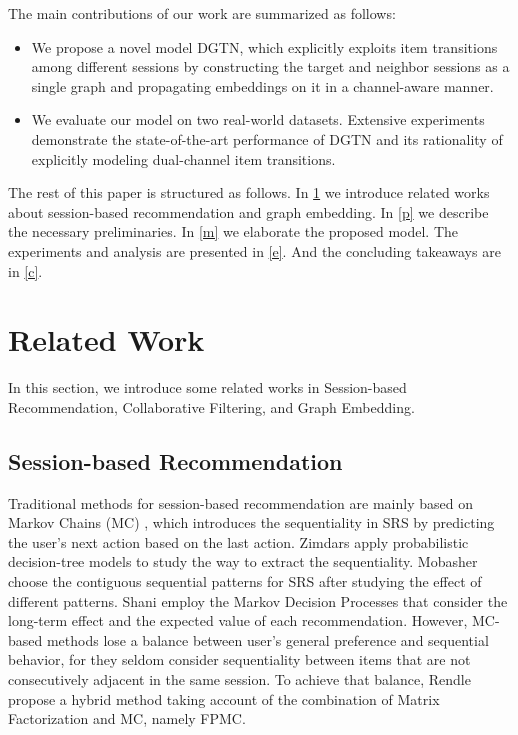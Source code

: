 \documentclass[conference]{IEEEtran}
\begin{document}
The main contributions of our work are summarized as follows:
\begin{itemize}
    \item {We propose a novel model DGTN, which explicitly exploits item transitions among different sessions by constructing the target and neighbor sessions as a single graph and propagating embeddings on it in a channel-aware manner. }  
    \item {We evaluate our model on two real-world datasets. Extensive experiments demonstrate the state-of-the-art performance of DGTN and its rationality of explicitly modeling dual-channel item transitions.}
\end{itemize}

The rest of this paper is structured as follows. In  \ref{r} we introduce related works about session-based recommendation and graph embedding. In  \ref{p} we describe the necessary preliminaries. In  \ref{m} we elaborate the proposed model. The experiments and analysis are presented in  \ref{e}. And the concluding takeaways are in  \ref{c}.


\section{Related Work}
\label{r}
\noindent In this section, we introduce some related works in Session-based Recommendation, Collaborative Filtering, and Graph Embedding.

\subsection{Session-based Recommendation}


\noindent Traditional methods for session-based recommendation are mainly based on Markov Chains (MC) \cite{zimdars01,Mobasher02,shani2005mdp,rendle2010factorizing}, which introduces the sequentiality in SRS by predicting the user's next action based on the last action. Zimdars  \cite{zimdars01} apply probabilistic decision-tree models to study the way to extract the sequentiality. Mobasher  \cite{Mobasher02} choose the contiguous sequential patterns for SRS after studying the effect of different patterns. Shani  \cite{shani2005mdp} employ the Markov Decision Processes that consider the long-term effect and the expected value of each recommendation. However, MC-based methods lose a balance between user's general preference and sequential behavior, for they seldom consider sequentiality between items that are not consecutively adjacent in the same session. To achieve that balance, Rendle  \cite{rendle2010factorizing} propose a hybrid method taking account of the combination of Matrix Factorization and MC, namely FPMC.
\end{document}
